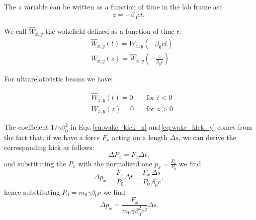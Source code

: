 The $z$ variable can be written as a function of time in the lab frame as:
\begin{equation}\label{eq:z}
    z = -\beta_0 c t,
\end{equation}

We call $\widehat{W}_{x,y}$ the wakefield defined as a function of time $t$:
\begin{align}
    &\widehat{W}_{x,y}(t) = {W}_{x,y}\left(-\beta_0 c t\right) \label{eq:wake_vs_t}\\
    &W_{x,y}(z) = \widehat{W}_{x,y}\left(-\frac{z}{\beta_0 c}\right) \label{eq:wake_vs_z}
\end{align}

For ultrarelativistic beams we have:

\begin{align}
    &\widehat{W}_{x,y}(t) = 0 \quad &\text{for } t < 0\\
    &W_{x,y}(z) = 0  \quad &\text{for } z > 0
\end{align}

The coefficient $1/\gamma\beta_0^2$ in Eqs.\,\ref{eq:wake_kick_x} and\,\ref{eq:wake_kick_y} comes from the fact that, if we have a force $F_x$ acting on a length $\Delta s$, we can derive the corresponding kick as follows:
\begin{equation}
    \Delta P_{x} = F_{x} \Delta t,
\end{equation}
and substituting the $P_{x}$ with the normalized one $p_{x} = \frac{P_{x}}{P_0}$ we find
\begin{equation}
    \Delta p_{x} = \frac{F_{x}}{P_0} \Delta t = \frac{F_{x}}{P_0}\frac{\Delta s }{\beta_0 c},
\end{equation}
hence substituting $P_0 = m_0 \gamma \beta_0 c$ we find
\begin{equation}
    \Delta p_{x} = \frac{F_{x}}{m_0 \gamma \beta_0^2 c^2} \Delta s.
\end{equation}

